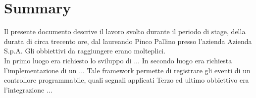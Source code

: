 
\cleardoublepage
{}
{}
\begingroup
\let\clearpage\relax
\let\cleardoublepage\relax
\let\cleardoublepage\relax

\chapter*{Summary}

Il presente documento descrive il lavoro svolto durante il periodo di stage, della durata di circa trecento ore, dal laureando Pinco Pallino presso l'azienda Azienda S.p.A.
Gli obbiettivi da raggiungere erano molteplici.\\
In primo luogo era richiesto lo sviluppo di ...
In secondo luogo era richiesta l'implementazione di un ... 
Tale framework permette di registrare gli eventi di un controllore programmabile, quali segnali applicati 
Terzo ed ultimo obbiettivo era l'integrazione ...

%
%

\endgroup			

\vfill

